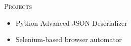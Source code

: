 \documentclass[11pt]{article}
\renewcommand{\section}[1]
{\vspace{1.0\baselineskip}{\Large\textbf{#1}}}
\newcommand{\makecolophon}
{\centering\ding{118} Last modified on \today~\ding{118}}
\begin{document}
\textsc{Projects}
\begin{itemize}
    \item[] Python Advanced JSON Deserializer
    \item[] Selenium-based browser automator
\end{itemize}





\end{document}
